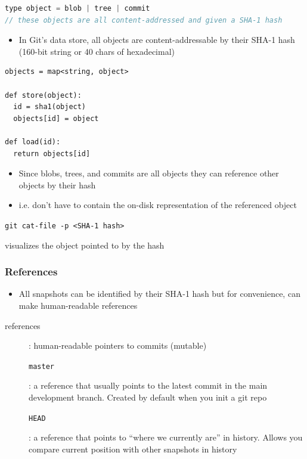 \documentclass[letterpaper,12pt]{article}
\newcommand*{\lstitem}[1]{
  \setbox0\hbox{\lstinline{#1}}
  \item[\usebox0]
}
\begin{document}
\begin{lstlisting}[language=c++]
type object = blob | tree | commit
// these objects are all content-addressed and given a SHA-1 hash
\end{lstlisting}

\begin{itemize}
 \item In Git's data store, all objects are content-addressable by their SHA-1 hash (160-bit string or 40 chars of hexadecimal)
\end{itemize}

\begin{lstlisting}
objects = map<string, object>

def store(object):
  id = sha1(object)
  objects[id] = object

def load(id):
  return objects[id]
\end{lstlisting}

\begin{itemize}
 \item Since blobs, trees, and commits are all objects they can reference other objects by their hash
 \item i.e. don't have to contain the on-disk representation of the referenced object
\end{itemize}

\begin{description}
 \lstitem{git cat-file -p <SHA-1 hash>} visualizes the object pointed to by the hash
\end{description}

\subsubsection{References}
\begin{itemize}
 \item All snapshots can be identified by their SHA-1 hash but for convenience, can make human-readable references
\end{itemize}

\begin{description}
 \item[references]: human-readable pointers to commits (mutable)
       \lstitem{master}: a reference that usually points to the latest commit in the main development branch. Created by default when you init a git repo
       \lstitem{HEAD}: a reference that points to ``where we currently are'' in history. Allows you compare current position with other snapshots in history
\end{description}
\end{document}
